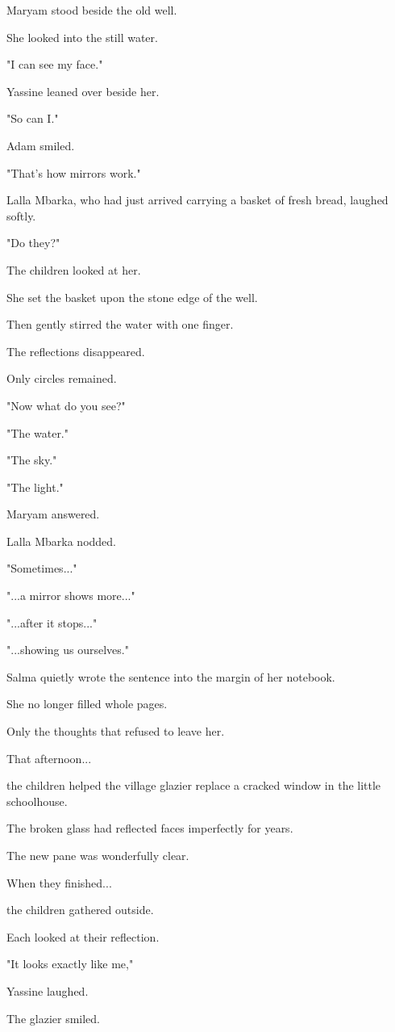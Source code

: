 \documentclass[12pt,openany]{book}
\begin{document}
Maryam stood beside the old well.

She looked into the still water.

"I can see my face."

Yassine leaned over beside her.

"So can I."

Adam smiled.

"That's how mirrors work."

Lalla Mbarka, who had just arrived carrying a basket of fresh bread, laughed softly.

"Do they?"

The children looked at her.

She set the basket upon the stone edge of the well.

Then gently stirred the water with one finger.

The reflections disappeared.

Only circles remained.

"Now what do you see?"

"The water."

"The sky."

"The light."

Maryam answered.

Lalla Mbarka nodded.

"Sometimes..."

"...a mirror shows more..."

"...after it stops..."

"...showing us ourselves."

Salma quietly wrote the sentence into the margin of her notebook.

She no longer filled whole pages.

Only the thoughts that refused to leave her.

That afternoon...

the children helped the village glazier replace a cracked window in the little schoolhouse.

The broken glass had reflected faces imperfectly for years.

The new pane was wonderfully clear.

When they finished...

the children gathered outside.

Each looked at their reflection.

"It looks exactly like me,"

Yassine laughed.

The glazier smiled.
\end{document}
